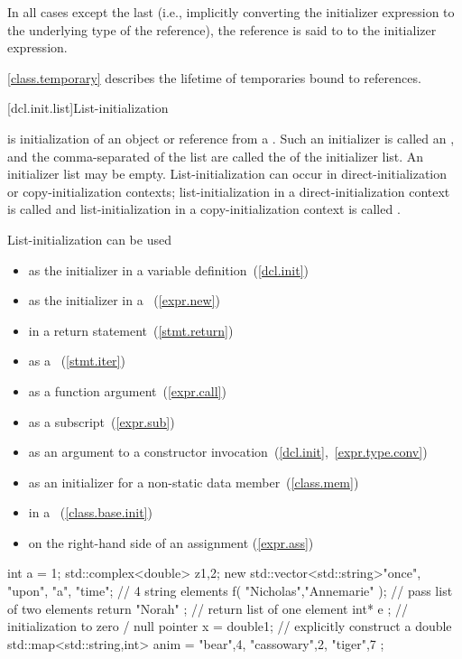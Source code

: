 In all cases except the last
(i.e., implicitly converting the initializer expression
to the underlying type of the reference),
the reference is said to  to the
initializer expression.

\pnum
\begin{note}
\ref{class.temporary} describes the lifetime of temporaries bound to references.
\end{note}

[dcl.init.list]{List-initialization}%

\pnum
{} is initialization of an object or reference from a
. Such an initializer is called an , and the comma-separated  of the list are
called the  of the initializer list. An initializer list may be empty.
List-initialization can occur in direct-initialization or copy-initialization contexts;
list-initialization in a direct-initialization context is called
 and list-initialization in a
copy-initialization context is called . \begin{note}
List-initialization can be used

\begin{itemize}
\item as the initializer in a variable definition~(\ref{dcl.init})
\item as the initializer in a ~(\ref{expr.new})
\item in a return statement~(\ref{stmt.return})
\item as a ~(\ref{stmt.iter})
\item as a function argument~(\ref{expr.call})
\item as a subscript~(\ref{expr.sub})
\item as an argument to a constructor invocation~(\ref{dcl.init},~\ref{expr.type.conv})
\item as an initializer for a non-static data member~(\ref{class.mem})
\item in a ~(\ref{class.base.init})
\item on the right-hand side of an assignment (\ref{expr.ass})
\end{itemize}

\begin{example}
\begin{codeblock}
int a = {1};
std::complex<double> z{1,2};
new std::vector<std::string>{"once", "upon", "a", "time"};  // 4 string elements
f( {"Nicholas","Annemarie"} );  // pass list of two elements
return { "Norah" };             // return list of one element
int* e {};                      // initialization to zero / null pointer
x = double{1};                  // explicitly construct a double 
std::map<std::string,int> anim = { {"bear",4}, {"cassowary",2}, {"tiger",7} };
\end{codeblock}
\end{example} \end{note}

